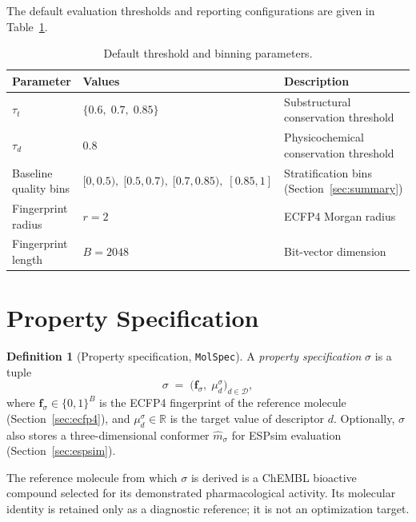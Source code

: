 \documentclass[11pt, a4paper]{article}
\theoremstyle{definition}
\newtheorem{definition}{Definition}[section]
\newcommand{\1}[1]{\mathbf{1}\!\left[#1\right]}   %
\newcommand{\Desc}{\mathcal{D}}                     %
\begin{document}
The default evaluation thresholds and reporting configurations are
given in Table~\ref{tab:thresholds}.

\begin{table}[h]
\centering
\caption{Default threshold and binning parameters.}
\label{tab:thresholds}
\begin{tabular}{lll}
\toprule
Parameter & Values & Description \\
\midrule
$\tau_t$ & $\{0.6,\; 0.7,\; 0.85\}$ & Substructural conservation threshold \\
$\tau_d$ & $0.8$ & Physicochemical conservation threshold \\
Baseline quality bins & $[0,0.5),\;[0.5,0.7),\;[0.7,0.85),\;[0.85,1]$
                      & Stratification bins (Section~\ref{sec:summary}) \\
Fingerprint radius & $r = 2$ & ECFP4 Morgan radius \\
Fingerprint length & $B = 2048$ & Bit-vector dimension \\
\bottomrule
\end{tabular}
\end{table}


\section{Property Specification}
\label{sec:spec}

\begin{definition}[Property specification, \texttt{MolSpec}]
\label{def:molspec}
A \emph{property specification} $\sigma$ is a tuple
\[
  \sigma \;=\; \bigl(\mathbf{f}_\sigma,\;
                      \mu_d^\sigma\bigr)_{d \in \Desc},
\]
where $\mathbf{f}_\sigma \in \{0,1\}^B$ is the ECFP4 fingerprint of the
reference molecule (Section~\ref{sec:ecfp4}), and
$\mu_d^\sigma \in \mathbb{R}$ is the target value of descriptor $d$.
Optionally, $\sigma$ also stores a three-dimensional conformer
$\hat{m}_\sigma$ for ESPsim evaluation (Section~\ref{sec:espsim}).
\end{definition}

The reference molecule from which $\sigma$ is derived is a ChEMBL bioactive
compound selected for its demonstrated pharmacological activity.
Its molecular identity is retained only as a diagnostic reference; it is
not an optimization target.
\end{document}
